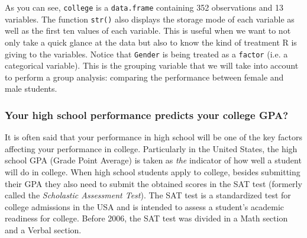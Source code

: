 \documentclass[12pt]{book}\usepackage{graphicx, color}
\newcommand{\code}[1]{\texttt{#1}}
\begin{document}
As you can see, \code{college} is a \code{data.frame} containing 352 observations and 13 variables. The function \code{str()} also displays the storage mode of each variable as well as the first ten values of each variable. This is useful when we want to not only take a quick glance at the data but also to know the kind of treatment R is giving to the variables. Notice that \code{Gender} is being treated as a \code{factor} (i.e. a categorical variable). This is the grouping variable that we will take into account to perform a group analysis: comparing the performance between female and male students.




\subsubsection*{Your high school performance predicts your college GPA?}
It is often said that your performance in high school will be one of the key factors affecting your performance in college. Particularly in the United States, the high school GPA (Grade Point Average) is taken as \textit{the} indicator of how well a student will do in college. When high school students apply to college, besides submitting their GPA they also need to submit the obtained scores in the SAT test (formerly called the \textit{Scholastic Assessment Test}). The SAT test is a standardized test for college admissions in the USA and is intended to assess a student's academic readiness for college. Before 2006, the SAT test was divided in a Math section and a Verbal section.
\end{document}
